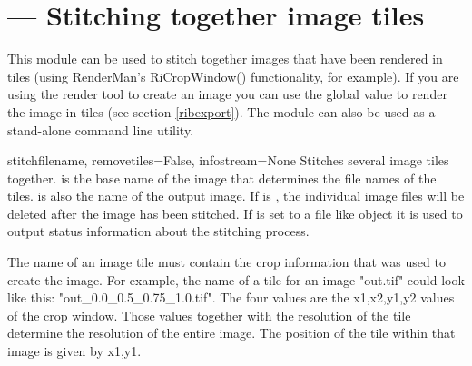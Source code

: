 \section{ ---
         Stitching together image tiles}


This module can be used to stitch together images that have been
rendered in tiles (using RenderMan's RiCropWindow() functionality, 
for example). If you are using the render tool to create an image
you can use the global value  to render the image in tiles
(see section \ref{ribexport}).
The module can also be used as a stand-alone command line utility.

\begin{funcdesc}{stitch}{filename, removetiles=False, infostream=None}
Stitches several image tiles together.   
 is the base name of the image that determines the file names
of the tiles.  is also the name of the output image.  If
 is , the individual image files will be deleted 
after the image has been stitched. If  is set to a file
like object it is used to output status information about the
stitching process.

The name of an image tile must contain the crop information that was
used to create the image. For example, the name of a tile for an image
"out.tif" could look like this: "out_0.0_0.5_0.75_1.0.tif".  The four
values are the x1,x2,y1,y2 values of the crop window. Those values
together with the resolution of the tile determine the resolution of
the entire image. The position of the tile within that image is given
by x1,y1.
\end{funcdesc}

